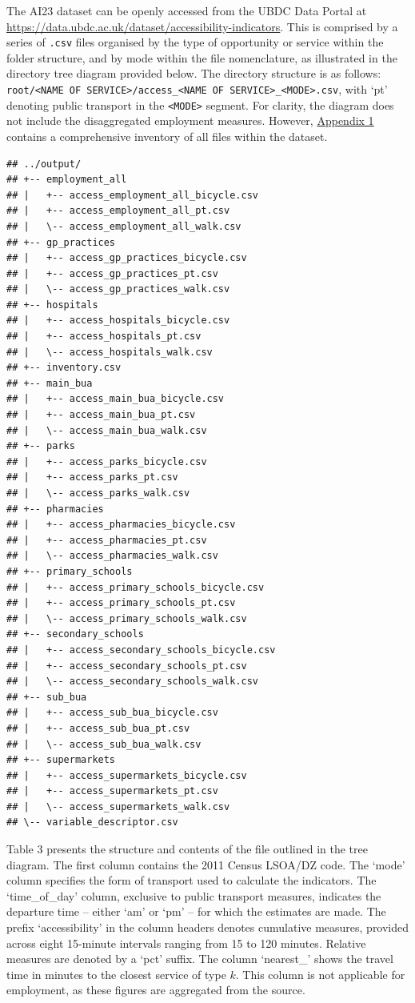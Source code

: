 \documentclass{article}
\begin{document}
The AI23 dataset can be openly accessed from the UBDC Data Portal at
\url{https://data.ubdc.ac.uk/dataset/accessibility-indicators}. This is
comprised by a series of \texttt{.csv} files organised by the type of
opportunity or service within the folder structure, and by mode within
the file nomenclature, as illustrated in the directory tree diagram
provided below. The directory structure is as follows:
\texttt{root/\textless{}NAME\ OF\ SERVICE\textgreater{}/access\_\textless{}NAME\ OF\ SERVICE\textgreater{}\_\textless{}MODE\textgreater{}.csv},
with `pt' denoting public transport in the
\texttt{\textless{}MODE\textgreater{}} segment. For clarity, the diagram
does not include the disaggregated employment measures. However,
\protect\hyperlink{inventory}{Appendix 1} contains a comprehensive
inventory of all files within the dataset.

\begin{verbatim}
## ../output/
## +-- employment_all
## |   +-- access_employment_all_bicycle.csv
## |   +-- access_employment_all_pt.csv
## |   \-- access_employment_all_walk.csv
## +-- gp_practices
## |   +-- access_gp_practices_bicycle.csv
## |   +-- access_gp_practices_pt.csv
## |   \-- access_gp_practices_walk.csv
## +-- hospitals
## |   +-- access_hospitals_bicycle.csv
## |   +-- access_hospitals_pt.csv
## |   \-- access_hospitals_walk.csv
## +-- inventory.csv
## +-- main_bua
## |   +-- access_main_bua_bicycle.csv
## |   +-- access_main_bua_pt.csv
## |   \-- access_main_bua_walk.csv
## +-- parks
## |   +-- access_parks_bicycle.csv
## |   +-- access_parks_pt.csv
## |   \-- access_parks_walk.csv
## +-- pharmacies
## |   +-- access_pharmacies_bicycle.csv
## |   +-- access_pharmacies_pt.csv
## |   \-- access_pharmacies_walk.csv
## +-- primary_schools
## |   +-- access_primary_schools_bicycle.csv
## |   +-- access_primary_schools_pt.csv
## |   \-- access_primary_schools_walk.csv
## +-- secondary_schools
## |   +-- access_secondary_schools_bicycle.csv
## |   +-- access_secondary_schools_pt.csv
## |   \-- access_secondary_schools_walk.csv
## +-- sub_bua
## |   +-- access_sub_bua_bicycle.csv
## |   +-- access_sub_bua_pt.csv
## |   \-- access_sub_bua_walk.csv
## +-- supermarkets
## |   +-- access_supermarkets_bicycle.csv
## |   +-- access_supermarkets_pt.csv
## |   \-- access_supermarkets_walk.csv
## \-- variable_descriptor.csv
\end{verbatim}

Table 3 presents the structure and contents of the file outlined in the
tree diagram. The first column contains the 2011 Census LSOA/DZ code.
The `mode' column specifies the form of transport used to calculate the
indicators. The `time\_of\_day' column, exclusive to public transport
measures, indicates the departure time -- either `am' or `pm' -- for
which the estimates are made. The prefix `accessibility' in the column
headers denotes cumulative measures, provided across eight 15-minute
intervals ranging from 15 to 120 minutes. Relative measures are denoted
by a `pct' suffix. The column `nearest\_' shows the travel time in
minutes to the closest service of type \(k\). This column is not
applicable for employment, as these figures are aggregated from the
source.
\end{document}
